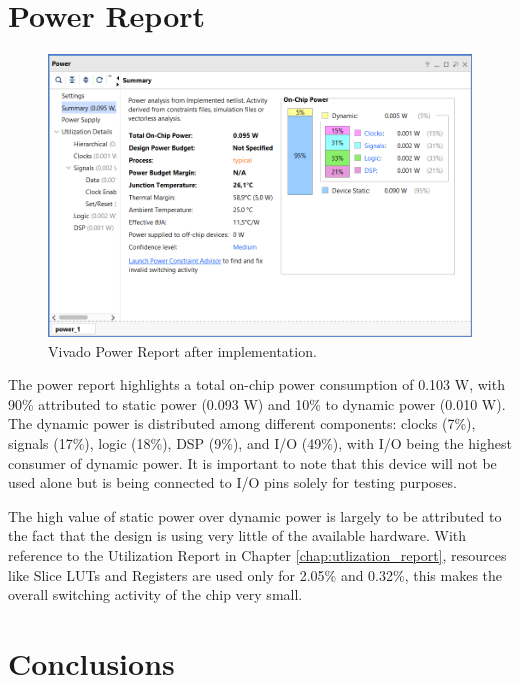 \section{Power Report}
\begin{figure}[H]
    \centering
    \captionsetup{skip=10pt} 
    \includegraphics[width=\textwidth]{./images/Vivado/power_report.png}
    \caption{Vivado Power Report after implementation.}
    \label{fig:power_report}
\end{figure}
The power report highlights a total on-chip power consumption of 0.103 W, with 90\% attributed to static power (0.093 W) and 10\% to dynamic power (0.010 W). The dynamic power is distributed among different components: clocks (7\%), signals (17\%), logic (18\%), DSP (9\%), and I/O (49\%), with I/O being the highest consumer of dynamic power. It is important to note that this device will not be used alone but is being connected to I/O pins solely for testing purposes.

The high value of static power over dynamic power is largely to be attributed to the fact that the design is using very little of the available hardware. With reference to the Utilization Report in Chapter \ref{chap:utlization_report}, resources like Slice LUTs and Registers are used only for 2.05\% and 0.32\%, this makes the overall switching activity of the chip very small.

\section{Conclusions}

